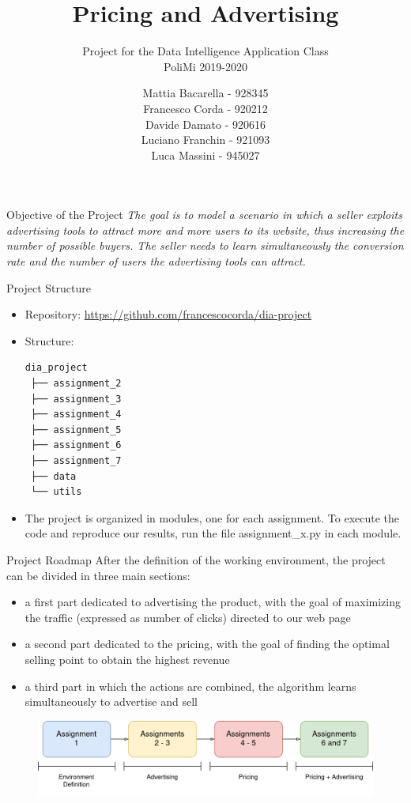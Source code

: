 \documentclass[11pt]{beamer}
\author{Mattia Bacarella - 928345\\
		Francesco Corda - 920212\\
		Davide Damato - 920616\\
		Luciano Franchin - 921093\\
		Luca Massini - 945027}
\title{Pricing and Advertising}
\subtitle{Project for the Data Intelligence Application Class\\
		PoliMi 2019-2020}
\begin{document}
\begin{frame}
\titlepage
\end{frame}


\begin{frame}{Objective of the Project}
\textit{The goal is to model a scenario in which a seller exploits advertising tools to attract more and more users to its website, thus increasing the number of possible buyers. The seller needs to learn simultaneously the conversion rate and the number of users the advertising tools can attract.}
\end{frame}

\begin{frame}[fragile]{Project Structure}
\begin{itemize}
\item Repository: \url{https://github.com/francescocorda/dia-project}
\item Structure:
\begin{verbatim}
dia_project
 ├── assignment_2
 ├── assignment_3
 ├── assignment_4
 ├── assignment_5
 ├── assignment_6
 ├── assignment_7
 ├── data
 └── utils
\end{verbatim}
\item The project is organized in modules, one for each assignment. To execute the code and reproduce our results, run the file assignment\_x.py in each module.
\end{itemize}
\end{frame}

\begin{frame}{Project Roadmap}
After the definition of the working environment, the project can be divided in three main sections:
\begin{itemize}
\item a first part dedicated to advertising the product, with the goal of maximizing the traffic (expressed as number of clicks) directed to our web page
\item a second part dedicated to the pricing, with the goal of finding the optimal selling point to obtain the highest revenue
\item a third part in which the actions are combined, the algorithm learns simultaneously to advertise and sell
\end{itemize}
\begin{figure}[hbtp]
\centering
\includegraphics[width=\textwidth]{images/roadmap.png}
\end{figure}

\end{frame}
\end{document}
